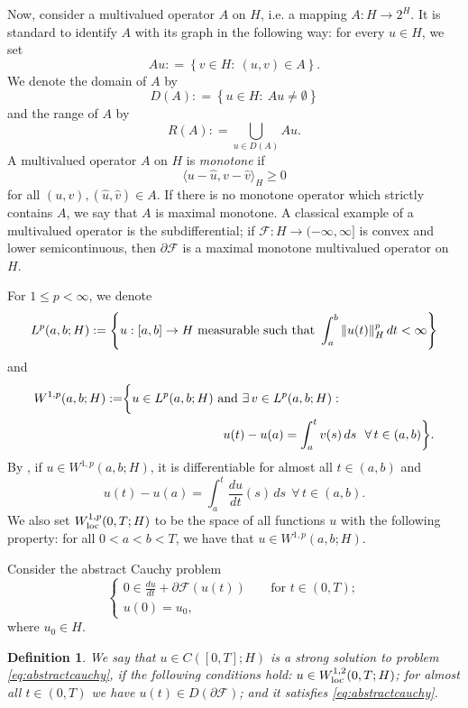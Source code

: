 \documentclass[reqno,12pt]{amsart}
\newtheorem{definition}[theorem]{Definition}
\numberwithin{equation}{section}
\begin{document}
Now, consider a multivalued operator $A$ on $H$, i.e. a mapping $A: H \rightarrow 2^H$. It is standard to identify $A$ with its graph in the following way: for every $u \in H$, we set
$$ Au : = \left\{ v \in H: \  (u,v) \in A \right\}.$$
We denote the domain of $A$ by
$$D (A) : = \left\{ u \in H: \ Au \not= \emptyset \right\}$$
and the range of $A$ by
$$R(A) : = \bigcup_{u \in D(A)} Au.$$
A multivalued operator $A$ on $H$ is {\it monotone} if
$$\langle u - \hat{u}, v - \hat{v} \rangle_H \geq 0$$
for all $(u,v), (\hat{u}, \hat{v}) \in A.$
If there is no monotone operator which strictly contains $A$, we say that $A$ is maximal monotone. A classical example of a multivalued operator is the subdifferential; if $\mathcal{F} : H \to (-\infty, \infty]$ is convex and lower semicontinuous, then $\partial \mathcal{F}$ is a maximal monotone multivalued operator on $H$.

For $1 \leq p < \infty$, we denote
$$L^p(a,b; H):= \left\{ u : [a,b] \rightarrow H \ \hbox{measurable such that} \  \int_a^b \Vert u(t) \Vert_H^p \, dt < \infty \right\}$$
and
\begin{align}
W^{1,p}(a,b;H):= &\bigg \{ u \in L^p(a,b; H) \ \hbox{and} \ \exists \, v \in L^p(a,b; H): \\
&\qquad\qquad\qquad\qquad u(t) - u(a) = \int_a^t v(s) \, ds \ \ \forall \, t \in (a,b)  \bigg \}.
\end{align}
By \cite[Corollaire A.2]{Brezis}, if $u \in W^{1,p}(a,b;H)$, it is differentiable for almost all $t \in (a,b)$ and
$$u(t) - u(a) = \int_a^t \frac{du}{dt}(s) \, ds \ \ \forall \, t \in (a,b).$$
We also set $W_{\rm loc}^{1,p}(0,T;H)$ to be the space of all functions $u$ with the following property: for all $0 < a < b < T$, we have that $u \in W^{1,p}(a,b;H)$.

Consider the abstract Cauchy problem
\begin{equation}\label{eq:abstractcauchy}
\left\{ \begin{array}{ll} 0 \in \frac{du}{dt} + \partial \mathcal{F} (u(t)) \, \quad &\mbox{for } t \in (0, T);  \\
[10pt] u(0) = u_0, \quad & \end{array} \right.
\end{equation}
where $u_0 \in H$.

\begin{definition} 
We say that $u \in C([0,T]; H)$ is a strong solution to problem \eqref{eq:abstractcauchy}, if the following conditions hold: $u \in W_{\rm loc}^{1,2}(0,T;H)$; for almost all $t \in (0,T)$ we have $u(t) \in D(\partial \mathcal{F})$; and it satisfies \eqref{eq:abstractcauchy}.
\end{definition}
\end{document}
